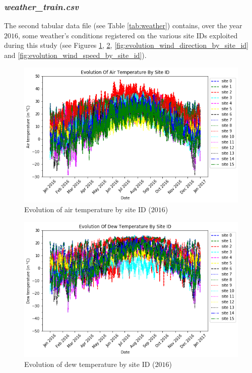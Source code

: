 \documentclass[twocolumn, switch]{article}
\begin{document}
\subsubsection{\textit{weather\_train.csv}}

The second tabular data file (see Table \ref{tab:weather}) contains, over the year $2016$, some weather's conditions registered on the various site IDs exploited during this study (see Figures \ref{fig:evolution_air_temperature_by_site_id}, \ref{fig:evolution_dew_temperature_by_site_id}, \ref{fig:evolution_wind_direction_by_site_id} and \ref{fig:evolution_wind_speed_by_site_id}).

\begin{figure}[H]
\centering
\includegraphics[scale=0.35]{../graphs/evolution_air_temperature_by_site_id}
\caption{Evolution of air temperature by site ID ($2016$)}
\label{fig:evolution_air_temperature_by_site_id}
\end{figure}

\begin{figure}[H]
\centering
\includegraphics[scale=0.35]{../graphs/evolution_dew_temperature_by_site_id}
\caption{Evolution of dew temperature by site ID ($2016$)}
\label{fig:evolution_dew_temperature_by_site_id}
\end{figure}
\end{document}
